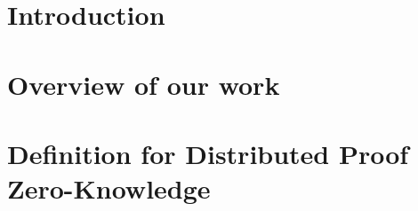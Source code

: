 \documentclass[USenglish,oneside,twocolumn]{article}
\begin{document}
\section{Introduction}
\label{sec:intro}

\section{Overview of our work}
\label{sec:overview}

%
\section{Definition for Distributed Proof Zero-Knowledge}
\label{sec:security model}

%
%
%
\end{document}

